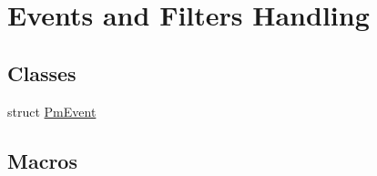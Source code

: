 \hypertarget{group__grp__events__filters}{}\section{Events and Filters Handling}
\label{group__grp__events__filters}
\subsection*{Classes}
\begin{DoxyCompactItemize}
\item 
struct \hyperlink{struct_pm_event}{Pm\+Event}
\end{DoxyCompactItemize}
\subsection*{Macros}
